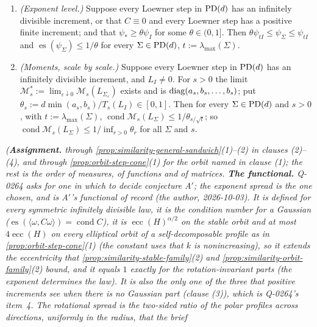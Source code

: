 \begin{proposition}
\begin{enumerate}
\[  \qquad
  \operatorname{rs}(L_\Sigma) \le 1/\theta ,
  \qquad
  \operatorname{es}(\psi_\Sigma) \le 1/\theta .
\]
\item \emph{(Exponent level.)} Suppose every Loewner step in $\mathrm{PD}(d)$ has an infinitely divisible
increment, or that $C \equiv 0$ and every Loewner step has a positive finite increment; and that
$\psi_* \ge \theta\psi_I$ for some $\theta \in (0,1]$. Then $\theta\psi_{tI} \le \psi_\Sigma \le \psi_{tI}$ and
$\operatorname{es}(\psi_\Sigma) \le 1/\theta$ for every $\Sigma \in \mathrm{PD}(d)$, $t := \lambda_{\max}(\Sigma)$.
\item \emph{(Moments, scale by scale.)} Suppose every Loewner step in $\mathrm{PD}(d)$ has an infinitely
divisible increment, and $L_I \ne 0$. For $s > 0$ the limit $\mathcal M_s^* := \lim_{\varepsilon\downarrow0}\mathcal M_s(L_{\Sigma_\varepsilon})$
exists and is $\operatorname{diag}(a_s, b_s, \dots, b_s)$; put $\theta_s := d\min(a_s,b_s)/T_s(L_I) \in [0,1]$. Then for every
$\Sigma \in \mathrm{PD}(d)$ and $s > 0$, with $t := \lambda_{\max}(\Sigma)$,
$\operatorname{cond}\mathcal M_s(L_\Sigma) \le 1/\theta_{s/\sqrt t}$; so
$\operatorname{cond}\mathcal M_s(L_\Sigma) \le 1/\inf_{r>0}\theta_r$ for all $\Sigma$ and $s$.
\end{enumerate}
\statusA\quad{}\quad\emph{(\textbf{Assignment.}  through
\ref{prop:similarity-general-sandwich}(1)--(2) in clauses (2)--(4), and through
\ref{prop:orbit-step-cone}(1) for the orbit named in clause (1); the rest is the order of measures,
of functions and of matrices. \textbf{The functional.} Q-0264 asks for one in which to decide
conjecture A$'$; the exponent spread is the one chosen, and is A$'$'s functional of record (the
author, 2026-10-03). It is defined for every symmetric
infinitely divisible law, it is the condition number for a Gaussian ($\operatorname{es}(\langle\omega,C\omega\rangle)
= \operatorname{cond}C$), it is $\operatorname{ecc}(H)^{\alpha/2}$ on the stable orbit and at most $4\operatorname{ecc}(H)$ on every
elliptical orbit of a self-decomposable profile as in \ref{prop:orbit-step-cone}(1) (the constant
uses that $k$ is nonincreasing), so it extends the eccentricity that \ref{prop:similarity-stable-family}(2) and
\ref{prop:similarity-orbit-family}(2) bound, and it equals $1$ exactly for the rotation-invariant parts
(the exponent determines the law). It is also the only one of the three that positive increments see
when there is no Gaussian part (clause (3)), which is Q-0264's item~4. The rotational spread is the
two-sided ratio of the polar profiles across directions, uniformly in the radius, that the brief
}
\end{proposition}
